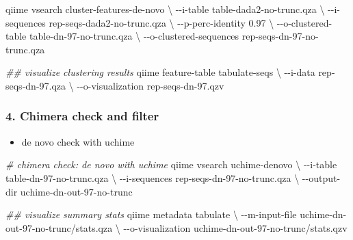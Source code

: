 \documentclass[
]{article}
\newenvironment{Shaded}{\begin{snugshade}}{\end{snugshade}}
\newcommand{\AttributeTok}[1]{\textcolor[rgb]{0.77,0.63,0.00}{#1}}
\newcommand{\CommentTok}[1]{\textcolor[rgb]{0.56,0.35,0.01}{\textit{#1}}}
\newcommand{\DataTypeTok}[1]{\textcolor[rgb]{0.13,0.29,0.53}{#1}}
\newcommand{\ExtensionTok}[1]{#1}
\newcommand{\NormalTok}[1]{#1}
\providecommand{\tightlist}{%
  \setlength{\itemsep}{0pt}\setlength{\parskip}{0pt}}
\begin{document}
\begin{Shaded}
\begin{Highlighting}[]
\ExtensionTok{qiime}\NormalTok{ vsearch cluster{-}features{-}de{-}novo }\DataTypeTok{\textbackslash{}}
  \AttributeTok{{-}{-}i{-}table}\NormalTok{ table{-}dada2{-}no{-}trunc.qza }\DataTypeTok{\textbackslash{}}
  \AttributeTok{{-}{-}i{-}sequences}\NormalTok{ rep{-}seqs{-}dada2{-}no{-}trunc.qza }\DataTypeTok{\textbackslash{}}
  \AttributeTok{{-}{-}p{-}perc{-}identity}\NormalTok{ 0.97 }\DataTypeTok{\textbackslash{}}
  \AttributeTok{{-}{-}o{-}clustered{-}table}\NormalTok{ table{-}dn{-}97{-}no{-}trunc.qza }\DataTypeTok{\textbackslash{}}
  \AttributeTok{{-}{-}o{-}clustered{-}sequences}\NormalTok{ rep{-}seqs{-}dn{-}97{-}no{-}trunc.qza}

\CommentTok{\#\# visualize clustering results}
\ExtensionTok{qiime}\NormalTok{ feature{-}table tabulate{-}seqs }\DataTypeTok{\textbackslash{}}
  \AttributeTok{{-}{-}i{-}data}\NormalTok{ rep{-}seqs{-}dn{-}97.qza }\DataTypeTok{\textbackslash{}}
  \AttributeTok{{-}{-}o{-}visualization}\NormalTok{ rep{-}seqs{-}dn{-}97.qzv }
\end{Highlighting}
\end{Shaded}

\hypertarget{chimera-check-and-filter}{%
\subsubsection{4. Chimera check and
filter}\label{chimera-check-and-filter}}

\begin{itemize}
\tightlist
\item
  de novo check with uchime
\end{itemize}

\begin{Shaded}
\begin{Highlighting}[]
\CommentTok{\# chimera check: de novo with uchime}
\ExtensionTok{qiime}\NormalTok{ vsearch uchime{-}denovo }\DataTypeTok{\textbackslash{}}
  \AttributeTok{{-}{-}i{-}table}\NormalTok{ table{-}dn{-}97{-}no{-}trunc.qza }\DataTypeTok{\textbackslash{}}
  \AttributeTok{{-}{-}i{-}sequences}\NormalTok{ rep{-}seqs{-}dn{-}97{-}no{-}trunc.qza }\DataTypeTok{\textbackslash{}}
  \AttributeTok{{-}{-}output{-}dir}\NormalTok{ uchime{-}dn{-}out{-}97{-}no{-}trunc}
  
\CommentTok{\#\# visualize summary stats}
\ExtensionTok{qiime}\NormalTok{ metadata tabulate }\DataTypeTok{\textbackslash{}}
  \AttributeTok{{-}{-}m{-}input{-}file}\NormalTok{ uchime{-}dn{-}out{-}97{-}no{-}trunc/stats.qza }\DataTypeTok{\textbackslash{}}
  \AttributeTok{{-}{-}o{-}visualization}\NormalTok{ uchime{-}dn{-}out{-}97{-}no{-}trunc/stats.qzv}
\end{Highlighting}
\end{Shaded}
\end{document}
